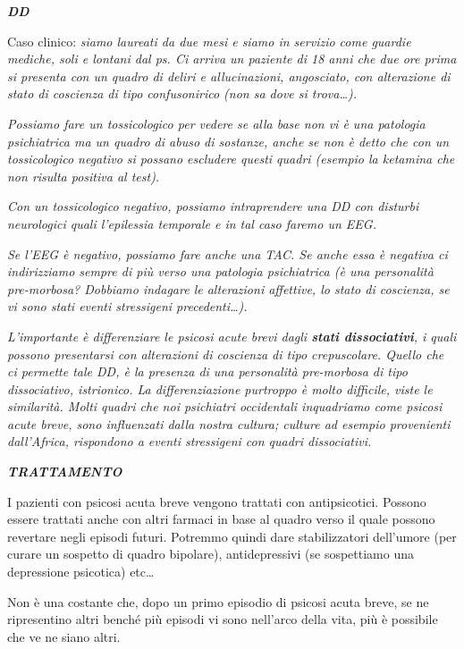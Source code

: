 \documentclass[]{article}
\begin{document}
\textbf{\emph{DD}}

Caso clinico: \emph{siamo laureati da due mesi e siamo in servizio come
guardie mediche, soli e lontani dal ps. Ci arriva un paziente di 18 anni
che due ore prima si presenta con un quadro di deliri e allucinazioni,
angosciato, con alterazione di stato di coscienza di tipo confusonirico
(non sa dove si trova\ldots{}). }

\emph{Possiamo fare un \emph{tossicologico} per vedere se alla base non
vi è una patologia psichiatrica ma un quadro di abuso di sostanze, anche
se non è detto che con un tossicologico negativo si possano escludere
questi quadri (esempio la ketamina che non risulta positiva al test).}

\emph{Con un tossicologico negativo, possiamo intraprendere una DD con
disturbi neurologici quali l'epilessia temporale e in tal caso faremo un
\emph{EEG}.}

\emph{Se l'EEG è negativo, possiamo fare anche una \emph{TAC}. Se anche
essa è negativa ci indirizziamo sempre di più verso una patologia
psichiatrica (è una personalità pre-morbosa? Dobbiamo indagare le
alterazioni affettive, lo stato di coscienza, se vi sono stati eventi
stressigeni precedenti\ldots{}).}

\emph{L'importante è differenziare le psicosi acute brevi dagli
\textbf{stati dissociativi}, i quali possono presentarsi con alterazioni
di coscienza di tipo crepuscolare. Quello che ci permette tale DD, è la
presenza di una personalità pre-morbosa di tipo dissociativo,
istrionico. La differenziazione purtroppo è molto difficile, viste le
similarità. Molti quadri che noi psichiatri occidentali inquadriamo come
psicosi acute breve, sono influenzati dalla nostra cultura; culture ad
esempio provenienti dall'Africa, rispondono a eventi stressigeni con
quadri dissociativi. }

\textbf{\emph{TRATTAMENTO}}

I pazienti con psicosi acuta breve vengono trattati con antipsicotici.
Possono essere trattati anche con altri farmaci in base al quadro verso
il quale possono revertare negli episodi futuri. Potremmo quindi dare
stabilizzatori dell'umore (per curare un sospetto di quadro bipolare),
antidepressivi (se sospettiamo una depressione psicotica) etc\ldots{}

Non è una costante che, dopo un primo episodio di psicosi acuta breve,
se ne ripresentino altri benché più episodi vi sono nell'arco della
vita, più è possibile che ve ne siano altri.
\end{document}
